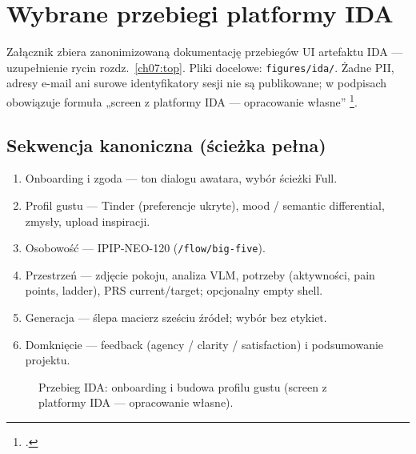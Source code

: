 \chapter{Wybrane przebiegi platformy IDA}
\label{app:h:top}

Załącznik zbiera zanonimizowaną dokumentację przebiegów UI artefaktu IDA --- uzupełnienie rycin rozdz.~\ref{ch07:top}. Pliki docelowe: \texttt{figures/ida/}. Żadne PII, adresy e-mail ani surowe identyfikatory sesji nie są publikowane; w podpisach obowiązuje formuła „screen z platformy IDA --- opracowanie własne” \footcite{idaPlatform2026}.

\section{Sekwencja kanoniczna (ścieżka pełna)}
\label{app:h:sec:full}

\begin{enumerate}
  \item Onboarding i zgoda --- ton dialogu awatara, wybór ścieżki Full.
  \item Profil gustu --- Tinder (preferencje ukryte), mood / semantic differential, zmysły, upload inspiracji.
  \item Osobowość --- IPIP-NEO-120 (\texttt{/flow/big-five}).
  \item Przestrzeń --- zdjęcie pokoju, analiza VLM, potrzeby (aktywności, pain points, ladder), PRS current/target; opcjonalny empty shell.
  \item Generacja --- ślepa macierz sześciu źródeł; wybór bez etykiet.
  \item Domknięcie --- feedback (agency / clarity / satisfaction) i podsumowanie projektu.
\end{enumerate}

\begin{figure}[htbp]
  \centering
  \caption{Przebieg IDA: onboarding i budowa profilu gustu (screen z platformy IDA --- opracowanie własne).}
  \label{fig:app:h:onboarding}
\end{figure}

